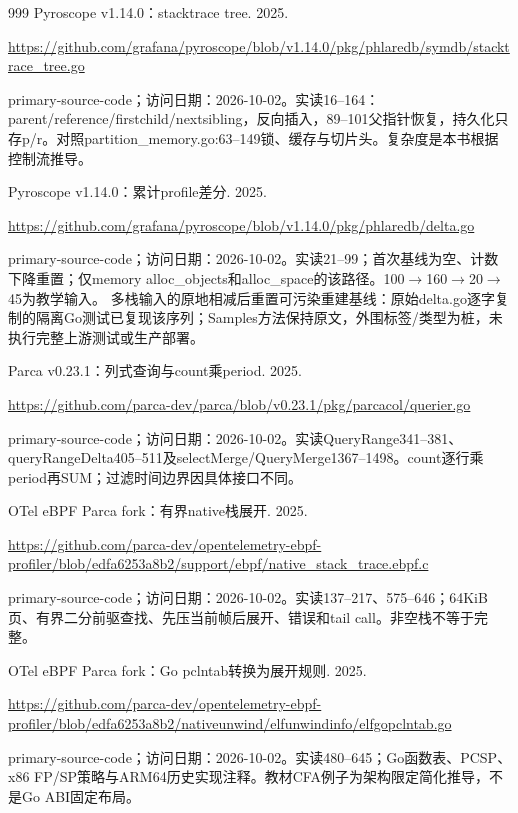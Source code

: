 \documentclass[UTF8,fontset=fandol,openany,11pt]{ctexbook}
\begin{document}
\begin{thebibliography}{999}
 Pyroscope v1.14.0：stacktrace tree. 2025.\par
\url{https://github.com/grafana/pyroscope/blob/v1.14.0/pkg/phlaredb/symdb/stacktrace_tree.go}\par
{\small primary-source-code；访问日期：2026-10-02。实读16–164：parent/\allowbreak{}reference/\allowbreak{}firstchild/\allowbreak{}nextsibling，反向插入，89–101父指针恢复，持久化只存p/\allowbreak{}r。对照partition\_\allowbreak{}memory.\allowbreak{}go:\allowbreak{}63–149锁、缓存与切片头。复杂度是本书根据控制流推导。}

 Pyroscope v1.14.0：累计profile差分. 2025.\par
\url{https://github.com/grafana/pyroscope/blob/v1.14.0/pkg/phlaredb/delta.go}\par
{\small primary-source-code；访问日期：2026-10-02。实读21–99；首次基线为空、计数下降重置；仅memory alloc\_\allowbreak{}objects和alloc\_\allowbreak{}space的该路径。100\ensuremath{\rightarrow}\allowbreak{}\allowbreak{}160\ensuremath{\rightarrow}\allowbreak{}\allowbreak{}20\ensuremath{\rightarrow}\allowbreak{}\allowbreak{}45为教学输入。 多栈输入的原地相减后重置可污染重建基线：原始delta.\allowbreak{}go逐字复制的隔离Go测试已复现该序列；Samples方法保持原文，外围标签/\allowbreak{}类型为桩，未执行完整上游测试或生产部署。}

 Parca v0.23.1：列式查询与count乘period. 2025.\par
\url{https://github.com/parca-dev/parca/blob/v0.23.1/pkg/parcacol/querier.go}\par
{\small primary-source-code；访问日期：2026-10-02。实读QueryRange\allowbreak{}341–381、queryRange\allowbreak{}Delta405–511及selectMerge/\allowbreak{}QueryMerge\allowbreak{}1367–1498。count逐行乘period再SUM；过滤时间边界因具体接口不同。}

 OTel eBPF Parca fork：有界native栈展开. 2025.\par
\url{https://github.com/parca-dev/opentelemetry-ebpf-profiler/blob/edfa6253a8b2/support/ebpf/native_stack_trace.ebpf.c}\par
{\small primary-source-code；访问日期：2026-10-02。实读137–217、575–646；64KiB页、有界二分前驱查找、先压当前帧后展开、错误和tail call。非空栈不等于完整。}

 OTel eBPF Parca fork：Go pclntab转换为展开规则. 2025.\par
\url{https://github.com/parca-dev/opentelemetry-ebpf-profiler/blob/edfa6253a8b2/nativeunwind/elfunwindinfo/elfgopclntab.go}\par
{\small primary-source-code；访问日期：2026-10-02。实读480–645；Go函数表、PCSP、x86 FP/\allowbreak{}SP策略与ARM64历史实现注释。教材CFA例子为架构限定简化推导，不是Go ABI固定布局。}


\end{thebibliography}
\end{document}
